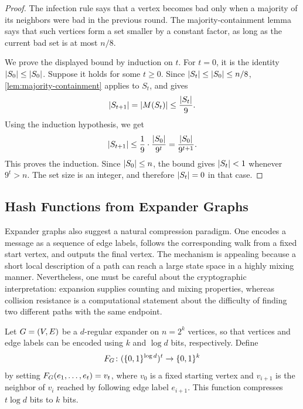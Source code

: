 \begin{proof}
	The infection rule says that a vertex becomes bad only when a majority of its neighbors were bad in the previous round. The majority-containment lemma says that such vertices form a set smaller by a constant factor, as long as the current bad set is at most \(n/8\).

	We prove the displayed bound by induction on \(t\). For \(t=0\), it is the identity \(\lvert S_0\rvert\leq \lvert S_0\rvert\). Suppose it holds for some \(t\geq 0\). Since \(\lvert S_t\rvert\leq \lvert S_0\rvert\leq n/8\), \cref{lem:majority-containment} applies to \(S_t\), and gives
	\begin{equation}
		\lvert S_{t+1}\rvert=\lvert M(S_t)\rvert\leq \frac{\lvert S_t\rvert}{9}.
	\end{equation}
	Using the induction hypothesis, we get
	\begin{equation}
		\lvert S_{t+1}\rvert\leq \frac{1}{9}\cdot \frac{\lvert S_0\rvert}{9^t}=\frac{\lvert S_0\rvert}{9^{t+1}}.
	\end{equation}
	This proves the induction. Since \(\lvert S_0\rvert\leq n\), the bound gives \(\lvert S_t\rvert<1\) whenever \(9^t>n\). The set size is an integer, and therefore \(\lvert S_t\rvert=0\) in that case.
\end{proof}

\subsection{Hash Functions from Expander Graphs}
\label{subsec:hash-functions}

Expander graphs also suggest a natural compression paradigm. One encodes a message as a sequence of edge labels, follows the corresponding walk from a fixed start vertex, and outputs the final vertex. The mechanism is appealing because a short local description of a path can reach a large state space in a highly mixing manner. Nevertheless, one must be careful about the cryptographic interpretation: expansion supplies counting and mixing properties, whereas collision resistance is a computational statement about the difficulty of finding two different paths with the same endpoint.

\begin{construction}
	\label{con:expander-hash}
	Let \(G=(V,E)\) be a \(d\)-regular expander on \(n=2^k\) vertices, so that vertices and edge labels can be encoded using \(k\) and \(\log d\) bits, respectively. Define
	\begin{equation}
		\label{eq:expander-hash-definition}
		F_{G}\colon(\{0,1\}^{\operatorname*{log} d})^t\to\{0,1\}^k
	\end{equation}
	by setting \(F_{G}(e_1,\ldots,e_t)=v_t\), where \(v_0\) is a fixed starting vertex and \(v_{i+1}\) is the neighbor of \(v_i\) reached by following edge label \(e_{i+1}\). This function compresses \(t\log d\) bits to \(k\) bits.
\end{construction}

